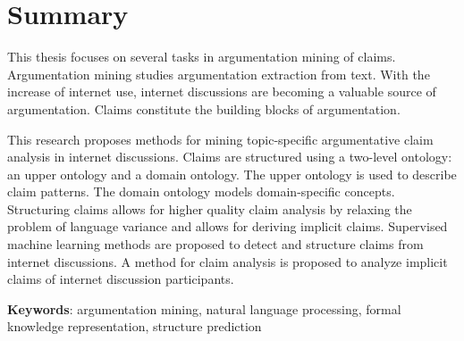 \thispagestyle{empty}

\section*{Summary}

This thesis focuses on several tasks in argumentation mining
of claims. Argumentation mining studies argumentation
extraction from text. With the increase of internet use, 
internet discussions are becoming a valuable source of 
argumentation. Claims constitute the building blocks of
argumentation. 

This research proposes methods for mining topic-specific
argumentative claim analysis in internet discussions. Claims are
structured using a two-level ontology: an upper ontology and a 
domain ontology. The upper ontology is used to describe claim patterns.
The domain ontology models domain-specific concepts. 
Structuring claims allows for higher quality claim
analysis by relaxing the problem of language variance 
and allows for deriving implicit claims. 
Supervised machine learning methods are proposed to detect
and structure claims from internet discussions. 
A method for claim analysis is proposed to analyze
implicit claims of internet discussion participants. 

\vspace{1cm}
\textbf{Keywords}:  
argumentation mining, natural language processing, 
formal knowledge representation, 
structure prediction
